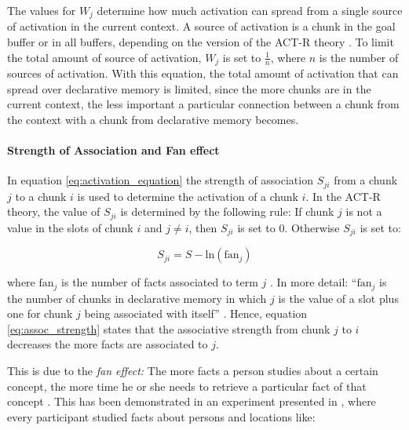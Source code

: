 The values for $W_j$ determine how much activation can spread from a single source of activation in the current context. A source of activation is a chunk in the goal buffer or in all buffers, %
depending on the version of the ACT-R theory \cites[1042]{anderson_integrated_2004}[33]{taatgen_modeling_2006}[unit 5, p. 1]{actr_tutorial}. To limit the total amount of source of activation, $W_j$ is set to $\frac{1}{n}$, where $n$ is the number of sources of activation. With this equation, the total amount of activation that can spread over declarative memory is limited, since the more chunks are in the current context, the less important a particular connection between a chunk from the context with a chunk from declarative memory becomes. 

\paragraph{Strength of Association and Fan effect}
\label{actr:fan_effect}

In equation \eqref{eq:activation_equation} the strength of association $S_{ji}$ from a chunk $j$ to a chunk $i$ is used to determine the activation of a chunk $i$.  In the ACT-R theory, the value of $S_{ji}$ is determined by the following rule: If chunk $j$ is not a value in the slots of chunk $i$ and $j \neq i$, then $S_{ji}$ is set to 0. Otherwise $S_{ji}$ is set to: 

\begin{equation}
\label{eq:assoc_strength}
S_{ji} = S - \mathrm{ln}(\mathrm{fan}_j)
\end{equation}

where $\mathrm{fan}_j$ is the number of facts associated to term $j$ \cite[1042]{anderson_implications_2000}. In more detail: ``$\mathrm{fan}_j$ is the number of chunks in declarative memory in which $j$ is the value of a slot plus one for chunk $j$ being associated with itself'' \cite[unit 5, p. 2]{actr_tutorial}. Hence, equation \eqref{eq:assoc_strength} states that the associative strength from chunk $j$ to $i$ decreases the more facts are associated to $j$.

This is due to the \emph{fan effect:} The more facts a person studies about a certain concept, the more time he or she needs to retrieve a particular fact of that concept \cite[186]{anderson_fan_1999}. This has been demonstrated in an experiment presented in \cite{anderson_fan_1999}, where every participant studied facts about persons and locations like:

